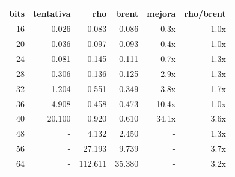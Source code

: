 \begin{tabular}{rrrrrr}
\toprule
bits & tentativa & rho & brent & mejora & rho/brent \\
\midrule
16 & 0.026 & 0.083 & 0.086 & 0.3x & 1.0x \\
20 & 0.036 & 0.097 & 0.093 & 0.4x & 1.0x \\
24 & 0.081 & 0.145 & 0.111 & 0.7x & 1.3x \\
28 & 0.306 & 0.136 & 0.125 & 2.9x & 1.3x \\
32 & 1.204 & 0.551 & 0.349 & 3.8x & 1.7x \\
36 & 4.908 & 0.458 & 0.473 & 10.4x & 1.0x \\
40 & 20.100 & 0.920 & 0.610 & 34.1x & 3.6x \\
48 & - & 4.132 & 2.450 & - & 1.3x \\
56 & - & 27.193 & 9.739 & - & 3.7x \\
64 & - & 112.611 & 35.380 & - & 3.2x \\
\bottomrule
\end{tabular}
